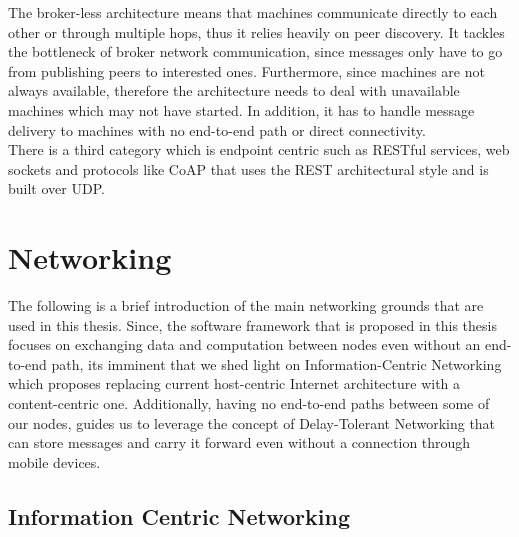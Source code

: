 \noindent The broker-less architecture means that machines communicate directly to each other or through multiple hops, thus it relies heavily on peer discovery. It tackles the bottleneck of broker network communication, since messages only have to go from publishing peers to interested ones.  Furthermore, since machines are not always available, therefore the architecture needs to deal with unavailable machines which may not have started. In addition, it has to handle message delivery to machines with no end-to-end path or direct connectivity.  \\


\noindent There is a third category which is endpoint centric such as RESTful services, web sockets and protocols like CoAP \cite{coAP} that uses the REST architectural style and is built over UDP.

\section{Networking}

The following is a brief introduction of the main networking grounds that are used in this thesis. Since, the software framework that is proposed in this thesis focuses on exchanging data and computation between nodes even without an end-to-end path, its imminent that we shed light on Information-Centric Networking which proposes replacing current host-centric  Internet architecture  with a content-centric one. Additionally,  having no end-to-end paths between some  of our nodes, guides us to leverage the concept of Delay-Tolerant Networking that can store messages and carry it forward even without a connection through mobile devices.
\subsection{Information Centric Networking}

